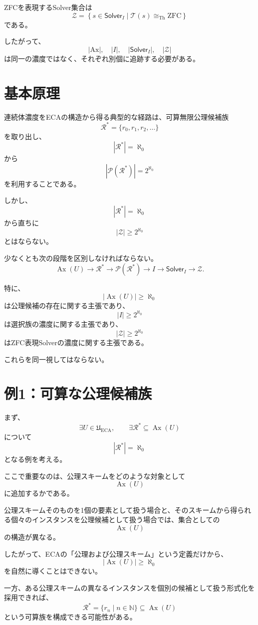 \documentclass[a4paper,11pt]{article}
\newcommand{\Ax}{\mathrm{Ax}}
\newcommand{\Solver}{\mathsf{Solver}}
\newcommand{\ZFC}{\mathrm{ZFC}}
\begin{document}
ZFCを表現するSolver集合は
\[
\boxed{
\mathcal{Z}
=
\left\{
s\in\Solver_I
\mid
\mathcal{T}(s)\cong_{\mathrm{Th}}\ZFC
\right\}
}
\]
である。

したがって、
\[
|\Ax|,\quad |I|,\quad |\Solver_I|,\quad |\mathcal{Z}|
\]
は同一の濃度ではなく、それぞれ別個に追跡する必要がある。

\section{基本原理}

連続体濃度をECAの構造から得る典型的な経路は、可算無限公理候補族
\[
\mathcal{R}^*
=
\{r_0,r_1,r_2,\ldots\}
\]
を取り出し、
\[
|\mathcal{R}^*|=\aleph_0
\]
から
\[
|\mathcal{P}(\mathcal{R}^*)|
=
2^{\aleph_0}
\]
を利用することである。

しかし、
\[
|\mathcal{R}^*|=\aleph_0
\]
から直ちに
\[
|\mathcal{Z}|\ge2^{\aleph_0}
\]
とはならない。

少なくとも次の段階を区別しなければならない。
\[
\operatorname{Ax}(U)
\longrightarrow
\mathcal{R}^*
\longrightarrow
\mathcal{P}(\mathcal{R}^*)
\longrightarrow
I
\longrightarrow
\Solver_I
\longrightarrow
\mathcal{Z}.
\]

特に、
\[
|\operatorname{Ax}(U)|\ge\aleph_0
\]
は公理候補の存在に関する主張であり、
\[
|I|\ge2^{\aleph_0}
\]
は選択族の濃度に関する主張であり、
\[
|\mathcal{Z}|\ge2^{\aleph_0}
\]
はZFC表現Solverの濃度に関する主張である。

これらを同一視してはならない。

\section{例1：可算な公理候補族}

まず、
\[
\exists U\in\mathfrak U_{\mathrm{ECA}},
\qquad
\exists\mathcal{R}^*\subseteq\operatorname{Ax}(U)
\]
について
\[
|\mathcal{R}^*|=\aleph_0
\]
となる例を考える。

ここで重要なのは、公理スキームをどのような対象として
\[
\operatorname{Ax}(U)
\]
に追加するかである。

公理スキームそのものを1個の要素として扱う場合と、そのスキームから得られる個々のインスタンスを公理候補として扱う場合では、集合としての
\[
\operatorname{Ax}(U)
\]
の構造が異なる。

したがって、ECAの「公理および公理スキーム」という定義だけから、
\[
|\operatorname{Ax}(U)|\ge\aleph_0
\]
を自然に導くことはできない。

一方、ある公理スキームの異なるインスタンスを個別の候補として扱う形式化を採用できれば、
\[
\mathcal{R}^*
=
\{r_n\mid n\in\mathbb{N}\}
\subseteq\operatorname{Ax}(U)
\]
という可算族を構成できる可能性がある。
\end{document}

